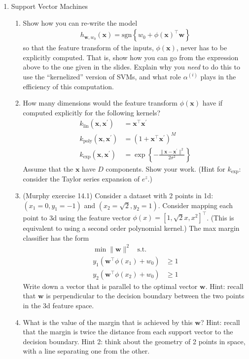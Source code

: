 \documentclass{article}
\begin{document}
\begin{enumerate}
\begin{enumerate}
	\end{enumerate}
	\item Support Vector Machines
	\begin{enumerate}
		\item Show how you can re-write the model
		\begin{align*}
			h_{\mathbf{w},w_0}(\mathbf{x}) = \text{sgn}\left\{ w_0 + \phi(\mathbf{x})^\top \mathbf{w} \right\}
		\end{align*}
		so that the feature transform of the inputs, \(\phi(\mathbf{x})\), never has to be explicitly computed. That is, show how you can go from the expression above to the one given in the slides. Explain why you \emph{need} to do this to use the ``kernelized'' version of SVMs, and what role \(\alpha^{(i)}\) plays in the efficiency of this computation.
		\item How many dimensions would the feature transform \(\phi(\mathbf{x})\) have if computed explicitly for the following kernels?
		\begin{align*}
			k_\text{lin}(\mathbf{x},\mathbf{x}^\prime) &= \mathbf{x}^\top\mathbf{x}^\prime\\
			k_\text{poly}(\mathbf{x},\mathbf{x}^\prime) &= (1+\mathbf{x}^\top\mathbf{x}^\prime)^M\\
			k_\text{exp}(\mathbf{x},\mathbf{x}^\prime) &= \exp\left\{-\frac{\lVert\mathbf{x}-\mathbf{x}^\prime\rVert^2}{2\sigma^2}\right\}
		\end{align*}
		Assume that the \(\mathbf{x}\) have \(D\) components. Show your work. (Hint for \(k_\text{exp}\): consider the Taylor series expansion of \(e^z\).)
		\item (Murphy exercise 14.1) Consider a dataset with 2 points in 1d: \((x_1=0,y_1=-1)\) and \((x_2=\sqrt{2},y_2=1)\). Consider mapping each point to 3d using the feature vector \(\phi(x)=[1, \sqrt{2}x, x^2]^\top\). (This is equivalent to using a second order polynomial kernel.) The max margin classifier has the form
		\begin{align*}
			\min \lVert\mathbf{w}\rVert^2~~~~\text{s.t.}&\\
			y_1(\mathbf{w}^\top\phi(x_1)+w_0)&\geq 1\\
			y_2(\mathbf{w}^\top\phi(x_2)+w_0)&\geq 1
		\end{align*}
		Write down a vector that is parallel to the optimal vector \(\mathbf{w}\). Hint: recall that \(\mathbf{w}\) is perpendicular to the decision boundary between the two points in the 3d feature space.
		\item What is the value of the margin that is achieved by this \(\mathbf{w}\)? Hint: recall that the margin is twice the distance from each support vector to the decision boundary. Hint 2: think about the geometry of 2 points in space, with a line separating one from the other.

\end{enumerate}
\end{enumerate}
\end{document}
